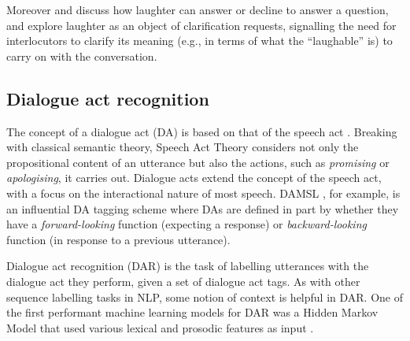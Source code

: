 \documentclass[11pt,a4paper]{article}
\begin{document}
Moreover \citet{romaniuk2009clinton} and \citet{ginzburg2020laughter}
discuss how laughter can answer or decline to answer a question, and
\citet{mazzocconi2018laughter} explore  laughter
as an object of clarification requests, signalling the need for
interlocutors to clarify its meaning (e.g., in terms of what the
``laughable'' is) to carry on with the conversation.




\subsection{Dialogue act recognition}
\label{sec:dial-act-recogn}

The concept of a dialogue act (DA) is based on that of the speech act
\citep{austin1975things}. %
Breaking with classical semantic
theory, Speech Act Theory considers not only the propositional content
of an utterance but also the actions, such as \emph{promising} or
\emph{apologising}, it carries out.  Dialogue acts extend the concept
of the speech act, with a focus on the interactional nature of most
speech.  DAMSL \citep{coreCodingDialogsDAMSL1997}, for example, is an
influential DA tagging scheme where DAs are
defined in part by whether they have a \emph{forward-looking} function
(expecting a response) or \emph{backward-looking} function (in
response to a previous utterance).

Dialogue act recognition (DAR) is the task of labelling utterances with
the dialogue act they perform, given a set of dialogue act tags.  As
with other sequence labelling tasks in NLP, some notion of context is
helpful in DAR.  One of the first performant machine learning models
for DAR was a Hidden Markov Model that used various lexical and
prosodic features as input \citep{stolckeDialogueActModeling2000}.
\end{document}
